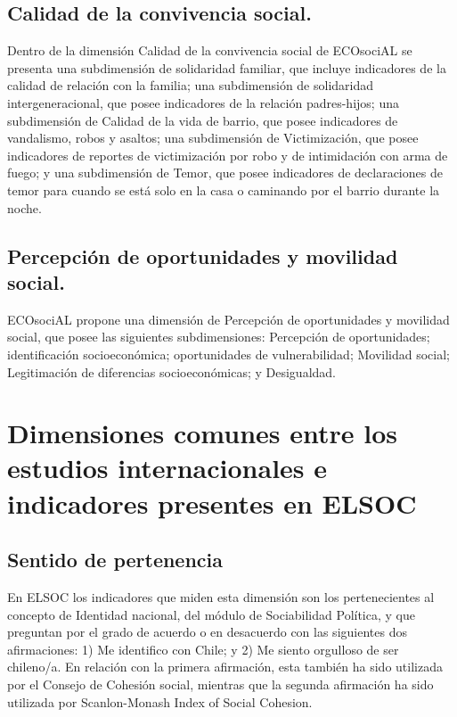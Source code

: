 \documentclass[
  12pt,
]{book}
\begin{document}
\hypertarget{calidad-de-la-convivencia-social.}{%
\section{Calidad de la convivencia social.}\label{calidad-de-la-convivencia-social.}}

Dentro de la dimensión Calidad de la convivencia social de ECOsociAL se presenta una subdimensión de solidaridad familiar, que incluye indicadores de la calidad de relación con la familia; una subdimensión de solidaridad intergeneracional, que posee indicadores de la relación padres-hijos; una subdimensión de Calidad de la vida de barrio, que posee indicadores de vandalismo, robos y asaltos; una subdimensión de Victimización, que posee indicadores de reportes de victimización por robo y de intimidación con arma de fuego; y una subdimensión de Temor, que posee indicadores de declaraciones de temor para cuando se está solo en la casa o caminando por el barrio durante la noche.

\hypertarget{percepciuxf3n-de-oportunidades-y-movilidad-social.}{%
\section{Percepción de oportunidades y movilidad social.}\label{percepciuxf3n-de-oportunidades-y-movilidad-social.}}

ECOsociAL propone una dimensión de Percepción de oportunidades y movilidad social, que posee las siguientes subdimensiones: Percepción de oportunidades; identificación socioeconómica; oportunidades de vulnerabilidad; Movilidad social; Legitimación de diferencias socioeconómicas; y Desigualdad.

\hypertarget{dimensiones-comunes-entre-los-estudios-internacionales-e-indicadores-presentes-en-elsoc}{%
\chapter{Dimensiones comunes entre los estudios internacionales e indicadores presentes en ELSOC}\label{dimensiones-comunes-entre-los-estudios-internacionales-e-indicadores-presentes-en-elsoc}}

\hypertarget{sentido-de-pertenencia-1}{%
\section{Sentido de pertenencia}\label{sentido-de-pertenencia-1}}

En ELSOC los indicadores que miden esta dimensión son los pertenecientes al concepto de Identidad nacional, del módulo de Sociabilidad Política, y que preguntan por el grado de acuerdo o en desacuerdo con las siguientes dos afirmaciones: 1) Me identifico con Chile; y 2) Me siento orgulloso de ser chileno/a. En relación con la primera afirmación, esta también ha sido utilizada por el Consejo de Cohesión social, mientras que la segunda afirmación ha sido utilizada por Scanlon-Monash Index of Social Cohesion.
\end{document}
